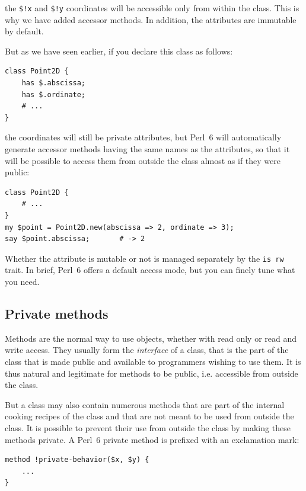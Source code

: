 the \verb'$!x' and \verb'$!y' coordinates will be 
accessible only from within the class. This is why 
we have added accessor methods. In addition, the 
attributes are immutable by default.

But as we have seen earlier, if you declare this class 
as follows:

\begin{verbatim}
class Point2D {
    has $.abscissa;
    has $.ordinate;
    # ...
}
\end{verbatim}

the coordinates will still be private attributes, but Perl~6 
will automatically generate accessor methods having the same 
names as the attributes, so that it will be possible to access 
them from outside the class almost as if they were public:

\begin{verbatim}
class Point2D {
    # ...
}
my $point = Point2D.new(abscissa => 2, ordinate => 3);
say $point.abscissa;       # -> 2
\end{verbatim}

Whether the attribute is mutable or not is managed separately 
by the {\tt is rw} trait. In brief, Perl~6 offers a default 
access mode, but you can finely tune what you need.


\subsection{Private methods}

Methods are the normal way to use objects, whether with read only 
or read and write access. They usually form the \emph{interface} 
of a class, that is the part of the class that is made public 
and available to programmers wishing to use them. It is thus 
natural and legitimate for methods to be public, i.e. accessible 
from outside the class.

But a class may also contain numerous methods that are part 
of the internal cooking recipes of the class and that are not 
meant to be used from outside the class. It is possible to prevent 
their use from outside the class by making these methods private. 
A Perl~6 private method is prefixed with an exclamation mark:

\begin{verbatim}
method !private-behavior($x, $y) {
    ...
}
\end{verbatim}

